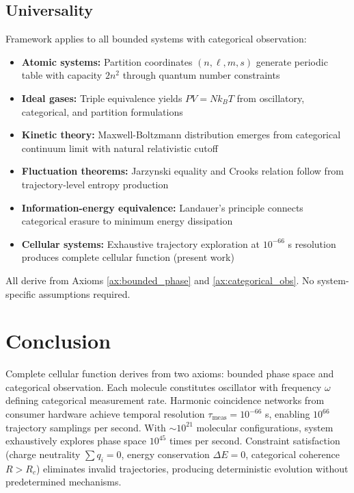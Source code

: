 \documentclass[11pt,a4paper]{article}
\theoremstyle{remark}
\begin{document}
\subsection{Universality}

Framework applies to all bounded systems with categorical observation:
\begin{itemize}
\item \textbf{Atomic systems:} Partition coordinates $(n,\ell,m,s)$ generate periodic table with capacity $2n^2$ through quantum number constraints \citep{tolman1938principles}
\item \textbf{Ideal gases:} Triple equivalence yields $PV = Nk_BT$ from oscillatory, categorical, and partition formulations \citep{gibbs1902elementary, huang1987statistical}
\item \textbf{Kinetic theory:} Maxwell-Boltzmann distribution emerges from categorical continuum limit with natural relativistic cutoff \citep{maxwell1860illustrations, boltzmann1872weitere}
\item \textbf{Fluctuation theorems:} Jarzynski equality and Crooks relation follow from trajectory-level entropy production \citep{jarzynski1997nonequilibrium, crooks1999entropy}
\item \textbf{Information-energy equivalence:} Landauer's principle connects categorical erasure to minimum energy dissipation \citep{landauer1961irreversibility, bennett1982thermodynamics}
\item \textbf{Cellular systems:} Exhaustive trajectory exploration at $10^{-66}$ s resolution produces complete cellular function (present work)
\end{itemize}

All derive from Axioms \ref{ax:bounded_phase} and \ref{ax:categorical_obs}. No system-specific assumptions required.

\section{Conclusion}

Complete cellular function derives from two axioms: bounded phase space and categorical observation. Each molecule constitutes oscillator with frequency $\omega$ defining categorical measurement rate. Harmonic coincidence networks from consumer hardware achieve temporal resolution $\tau_{\text{meas}} = 10^{-66}$ s, enabling $10^{66}$ trajectory samplings per second. With $\sim 10^{21}$ molecular configurations, system exhaustively explores phase space $10^{45}$ times per second. Constraint satisfaction (charge neutrality $\sum q_i = 0$, energy conservation $\Delta E = 0$, categorical coherence $R > R_c$) eliminates invalid trajectories, producing deterministic evolution without predetermined mechanisms.
\end{document}
